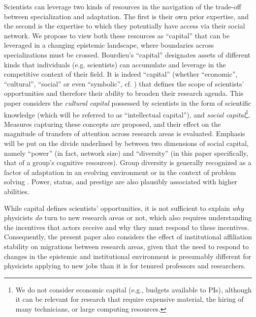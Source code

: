 \documentclass{article}
\begin{document}
Scientists can leverage two kinds of resources in the navigation of the trade-off between specialization and adaptation. The first is their own prior expertise, and the second is the expertise to which they potentially have access via their social network. We propose to view both these resources as ``capital'' \citep{Bourdieu1986} that can be leveraged in a changing epistemic landscape, where boundaries across specializations must be crossed. Bourdieu's ``capital'' designates assets of different kinds that individuals (e.g. scientists) can accumulate and leverage in the competitive context of their field. It is indeed ``capital''  (whether ``economic'', ``cultural'', ``social'' or even ``symbolic'', cf. \citealt{Bourdieu1986}) that defines the scope of scientists' opportunities and therefore their ability to broaden their research agenda. This paper considers the \textit{cultural capital} possessed by scientists in the form of scientific knowledge (which will be referred to as ``intellectual capital''), and \textit{social capital}\footnote{We do not consider economic capital (e.g., budgets available to PIs), although it can be relevant for research that require expensive material,  the hiring of many technicians, or large computing resources.}. Measures capturing these concepts are proposed, and their effect on the magnitude of transfers of attention across research areas is evaluated. Emphasis will be put on the divide underlined by \citet{Abbasi2014} between two dimensions of social capital, namely ``power'' (in fact, network size) and ``diversity'' (in this paper specifically, that of a group's cognitive resources). Group diversity is generally recognized as a factor of adaptation in an evolving environment \citep{Schimmelpfennig2021,Muthukrishna2016,Henrich2004} or in the context of problem solving \citep{Hong2004}. Power, status, and prestige are also plausibly associated with higher abilities.

While capital defines scientists' opportunities, it is not sufficient to explain \textit{why} physicists \textit{do} turn to new research areas or not, which also requires understanding the incentives that actors receive and why they must respond to these incentives. Consequently, the present paper also considers the effect of institutional affiliation stability on migrations between research areas, given that the need to respond to changes in the epistemic and institutional environment is presumably different for physicists applying to new jobs than it is for tenured professors and researchers.%
\end{document}
